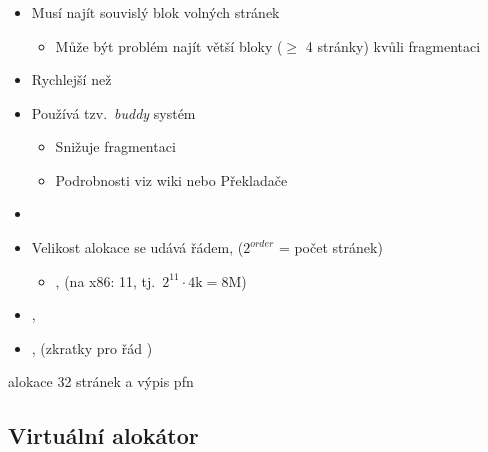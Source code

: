 \begin{frame}
  \frametitle{}

  \begin{itemize}
  \item Musí najít souvislý blok volných stránek
  \begin{itemize}
    \item Může být problém najít větší bloky ($\geq$ 4 stránky) kvůli
      fragmentaci
  \end{itemize}

  \item Rychlejší než 

  \item Používá tzv.\ \emph{buddy} systém
  \begin{itemize}
    \item Snižuje fragmentaci
    \item Podrobnosti viz wiki \iffimuni nebo Překladače \fi
  \end{itemize}

  \pause

  \item {}
  \item Velikost alokace se udává řádem,  ($2^{order}$ = počet
    stránek)
  \begin{itemize}
    \item {},  (na x86: 11, tj.\
      $2^{11} \cdot 4\text{k} = 8\text{M}$)
  \end{itemize}

  \item {}, 
  \item {},  (zkratky pro řád )
  \end{itemize}

  \iffimuni
  \bigskip
  \pause

   alokace 32 stránek a výpis pfn
  \fi

\end{frame}

\iffimuni
\subsection{Virtuální alokátor}
\fi

